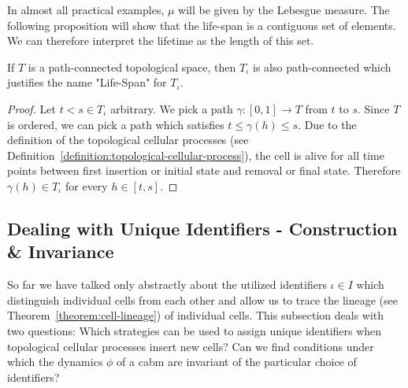 In almost all practical examples, $\mu$ will be given by the Lebesgue measure.
The following proposition will show that the life-span is a contiguous set of elements.
We can therefore interpret the lifetime as the length of this set.

\begin{proposition}
    If $T$ is a path-connected topological space, then $T_\iota$ is also path-connected which
    justifies the name "Life-Span" for $T_\iota$.
\end{proposition}
\begin{proof}
    Let $t<s\in T_\iota$ arbitrary.
    We pick a path $\gamma:[0,1]\rightarrow T$ from $t$ to $s$.
    Since $T$ is ordered, we can pick a path which satisfies $t\leq\gamma(h)\leq s$.
    Due to the definition of the topological cellular processes (see
    Definition~\ref{definition:topological-cellular-process}), the cell is alive for all time points
    between first insertion or initial state and removal or final state.
    Therefore $\gamma(h)\in T_\iota$ for every $h\in[t,s]$.
\end{proof}

\subsection{Dealing with Unique Identifiers - Construction \& Invariance}
So far we have talked only abstractly about the utilized identifiers $\iota\in I$ which distinguish
individual cells from each other and allow us to trace the lineage (see
Theorem~\ref{theorem:cell-lineage}) of individual cells.
This subsection deals with two questions: Which strategies can be used to assign unique identifiers
when topological cellular processes insert new cells?
Can we find conditions under which the dynamics $\phi$ of a \ac{cabm} are invariant of the
particular choice of identifiers?

